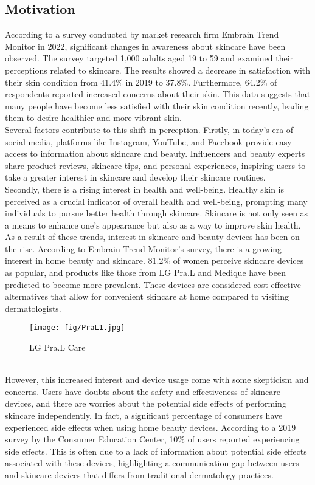 \documentclass[conference]{IEEEtran}
\begin{document}
\subsection{Motivation} 
According to a survey conducted by market research firm Embrain Trend Monitor in 2022, significant changes in awareness about skincare have been observed. The survey targeted 1,000 adults aged 19 to 59 and examined their perceptions related to skincare. The results showed a decrease in satisfaction with their skin condition from 41.4\% in 2019 to 37.8\%. Furthermore, 64.2\% of respondents reported increased concerns about their skin. This data suggests that many people have become less satisfied with their skin condition recently, leading them to desire healthier and more vibrant skin.
\\Several factors contribute to this shift in perception. Firstly, in today's era of social media, platforms like Instagram, YouTube, and Facebook provide easy access to information about skincare and beauty. Influencers and beauty experts share product reviews, skincare tips, and personal experiences, inspiring users to take a greater interest in skincare and develop their skincare routines.
\\Secondly, there is a rising interest in health and well-being. Healthy skin is perceived as a crucial indicator of overall health and well-being, prompting many individuals to pursue better health through skincare. Skincare is not only seen as a means to enhance one's appearance but also as a way to improve skin health.
\\As a result of these trends, interest in skincare and beauty devices has been on the rise. According to Embrain Trend Monitor's survey, there is a growing interest in home beauty and skincare. 81.2\% of women perceive skincare devices as popular, and products like those from LG Pra.L and Medique have been predicted to become more prevalent. These devices are considered cost-effective alternatives that allow for convenient skincare at home compared to visiting dermatologists.
\begin{figure} [h]
    \centering
    \texttt{[image: fig/PraL1.jpg]}
    \caption{LG Pra.L Care}
\end{figure}
\\However, this increased interest and device usage come with some skepticism and concerns. Users have doubts about the safety and effectiveness of skincare devices, and there are worries about the potential side effects of performing skincare independently. In fact, a significant percentage of consumers have experienced side effects when using home beauty devices. According to a 2019 survey by the Consumer Education Center, 10\% of users reported experiencing side effects. This is often due to a lack of information about potential side effects associated with these devices, highlighting a communication gap between users and skincare devices that differs from traditional dermatology practices.
\end{document}
